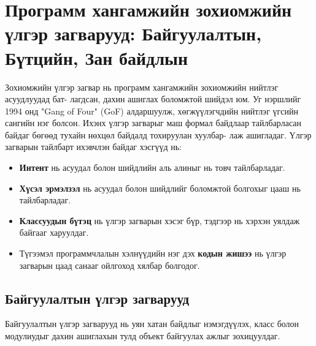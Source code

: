 \section{Программ хангамжийн зохиомжийн үлгэр загварууд: Байгуулалтын, Бүтцийн, Зан байдлын}
Зохиомжийн үлгэр загвар нь программ хангамжийн зохиомжийн нийтлэг асуудлуудад бат- лагдсан, дахин ашиглах боломжтой шийдэл юм. Уг нэршлийг 1994 онд "Gang of Four" (GoF) алдаршуулж, хөгжүүлэгчдийн нийтлэг үгсийн сангийн нэг болсон. Ихэнх үлгэр загварыг маш формал байдлаар тайлбарласан байдаг бөгөөд тухайн нөхцөл байдалд тохируулан хуулбар- лаж ашигладаг. Үлгэр загварын тайлбарт ихэвчлэн байдаг хэсгүүд нь:
\begin{itemize}
	\item \textbf{Интент} нь асуудал болон шийдлийн аль алиныг нь товч тайлбарладаг.
	\item \textbf{Хүсэл эрмэлзэл} нь асуудал болон шийдлийг боломжтой болгохыг цааш нь тайлбарладаг.
	\item \textbf{Классуудын бүтэц} нь үлгэр загварын хэсэг бүр, тэдгээр нь хэрхэн уялдаж байгааг харуулдаг.
	\item Түгээмэл программчлалын хэлнүүдийн нэг дэх \textbf{кодын жишээ} нь үлгэр загварын цаад санааг ойлгоход хялбар болгодог.
\end{itemize}
\subsection{Байгуулалтын үлгэр загварууд}
Байгуулалтын үлгэр загварууд нь уян хатан байдлыг нэмэгдүүлэх, класс болон модулиудыг дахин ашиглахын тулд объект байгуулах ажлыг зохицуулдаг.


